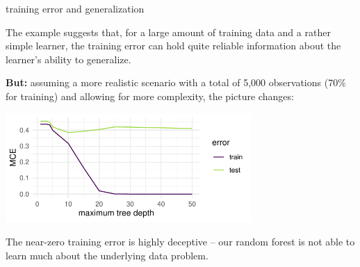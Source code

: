 \documentclass[11pt,compress,t,notes=noshow, xcolor=table]{beamer}
\begin{document}
\begin{vbframe}{training error and generalization}
\framebreak


\small

The example suggests that, for a large amount of training data and a rather
simple learner, the training error can hold quite reliable information about 
the learner's ability to generalize.

\vfill

\textbf{But:} assuming a more realistic scenario with a total of 5,000 
observations (70\% for training) and allowing for more complexity, the picture 
changes:

\vfill

\begin{center}
\includegraphics[width = 0.7\textwidth]{figure/eval_delta_train_test_overfit}
\end{center}

\vfill

The near-zero training error is highly deceptive -- our random forest is not 
able to learn much about the underlying data problem.

\end{vbframe}


\endlecture
\end{document}
